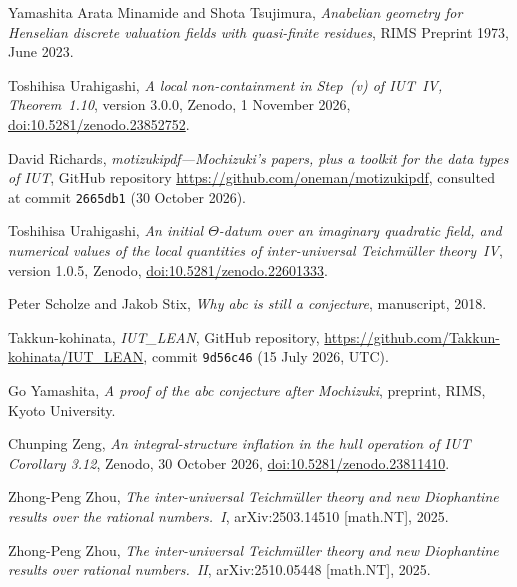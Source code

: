 \documentclass[11pt,a4paper]{article}
\begin{document}
\begin{thebibliography}{Yamashita}
Arata Minamide and Shota Tsujimura, \emph{Anabelian geometry for {H}enselian discrete valuation fields with
quasi-finite residues}, RIMS Preprint 1973, June 2023.

Toshihisa Urahigashi, \emph{A local non-containment in Step~(v) of {IUT}~{IV}, Theorem~1.10}, version 3.0.0,
Zenodo, 1 November 2026, \href{https://doi.org/10.5281/zenodo.23852752}{doi:10.5281/zenodo.23852752}.

David Richards, \emph{motizukipdf---{M}ochizuki's papers, plus a toolkit for the data types of {IUT}}, GitHub
repository \url{https://github.com/oneman/motizukipdf}, consulted at commit \texttt{2665db1} (30 October 2026).

Toshihisa Urahigashi, \emph{An initial $\Theta$-datum over an imaginary quadratic field, and numerical values
of the local quantities of inter-universal {T}eichm\"uller theory~{IV}}, version 1.0.5, Zenodo,
\href{https://doi.org/10.5281/zenodo.22601333}{doi:10.5281/zenodo.22601333}.

Peter Scholze and Jakob Stix, \emph{Why abc is still a conjecture}, manuscript, 2018.

Takkun-kohinata, \emph{IUT\_LEAN}, GitHub repository, \url{https://github.com/Takkun-kohinata/IUT_LEAN}, commit
\texttt{9d56c46} (15 July 2026, UTC).

Go Yamashita, \emph{A proof of the abc conjecture after {M}ochizuki}, preprint, RIMS, Kyoto University.

Chunping Zeng, \emph{An integral-structure inflation in the hull operation of {IUT} {C}orollary 3.12}, Zenodo, 30
October 2026, \href{https://doi.org/10.5281/zenodo.23811410}{doi:10.5281/zenodo.23811410}.

Zhong-Peng Zhou, \emph{The inter-universal {T}eichm\"uller theory and new {D}iophantine results over the
rational numbers.~{I}}, arXiv:2503.14510 [math.NT], 2025.

Zhong-Peng Zhou, \emph{The inter-universal {T}eichm\"uller theory and new {D}iophantine results over
rational numbers.~{II}}, arXiv:2510.05448 [math.NT], 2025.

\end{thebibliography}
\end{document}
